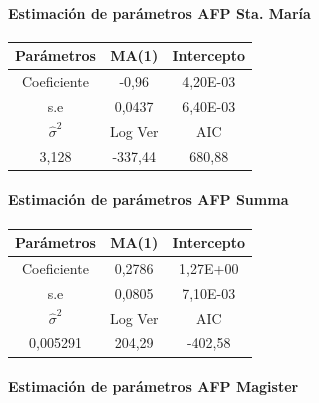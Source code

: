 \paragraph{Estimaci\'on de par\'ametros AFP Sta. Mar\'ia}
\begin{center}
\begin{tabular}{|l|l|l|}
\hline
\multicolumn{1}{|c|}{Par\'ametros} & \multicolumn{1}{c|}{MA(1)} & \multicolumn{1}{c|}{Intercepto} \\
\hline
\multicolumn{1}{|c|}{Coeficiente} & \multicolumn{1}{c|}{-0,96} & \multicolumn{1}{c|}{4,20E-03} \\
\hline
\multicolumn{1}{|c|}{s.e} & \multicolumn{1}{c|}{0,0437} & \multicolumn{1}{c|}{6,40E-03} \\
\hline
\multicolumn{1}{|c|}{$\hat{\sigma}^{2}$} & \multicolumn{1}{c|}{Log Ver} & \multicolumn{1}{c|}{AIC} \\
\hline
\multicolumn{1}{|c|}{3,128} & \multicolumn{1}{c|}{-337,44} & \multicolumn{1}{c|}{680,88} \\
\hline
\end{tabular}
\end{center}
\paragraph{Estimaci\'on de par\'ametros AFP Summa}
\begin{center}
\begin{tabular}{|l|l|l|}
\hline
\multicolumn{1}{|c|}{Par\'ametros} & \multicolumn{1}{c|}{MA(1)} & \multicolumn{1}{c|}{Intercepto} \\
\hline
\multicolumn{1}{|c|}{Coeficiente} & \multicolumn{1}{c|}{0,2786} & \multicolumn{1}{c|}{1,27E+00} \\
\hline
\multicolumn{1}{|c|}{s.e} & \multicolumn{1}{c|}{0,0805} & \multicolumn{1}{c|}{7,10E-03} \\
\hline
\multicolumn{1}{|c|}{$\hat{\sigma}^{2}$} & \multicolumn{1}{c|}{Log Ver} & \multicolumn{1}{c|}{AIC} \\
\hline
\multicolumn{1}{|c|}{0,005291} & \multicolumn{1}{c|}{204,29} & \multicolumn{1}{c|}{-402,58} \\
\hline
\end{tabular}
\end{center}
\paragraph{Estimaci\'on de par\'ametros AFP Magister}

